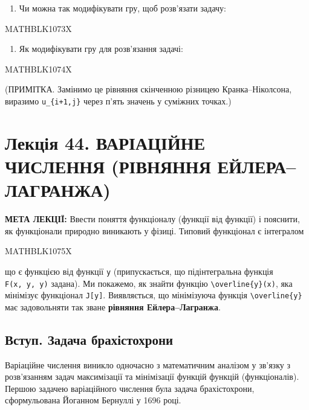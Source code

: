 \documentclass[
  ukrainian,
]{article}
\providecommand{\tightlist}{%
  \setlength{\itemsep}{0pt}\setlength{\parskip}{0pt}}
\begin{document}
\begin{enumerate}
\def\labelenumi{\arabic{enumi}.}
\setcounter{enumi}{3}
\tightlist
\item
  Чи можна так модифікувати гру, щоб розв'язати задачу:
\end{enumerate}

MATHBLK1073X

\begin{enumerate}
\def\labelenumi{\arabic{enumi}.}
\setcounter{enumi}{4}
\tightlist
\item
  Як модифікувати гру для розв'язання задачі:
\end{enumerate}

MATHBLK1074X

(ПРИМІТКА. Замінимо це рівняння скінченною різницею Кранка--Ніколсона,
виразимо \texttt{u\_\{i+1,j\}} через п'ять значень у суміжних точках.)

\section{Лекція 44. ВАРІАЦІЙНЕ ЧИСЛЕННЯ (РІВНЯННЯ
ЕЙЛЕРА--ЛАГРАНЖА)}\label{ux43bux435ux43aux446ux456ux44f-44.-ux432ux430ux440ux456ux430ux446ux456ux439ux43dux435-ux447ux438ux441ux43bux435ux43dux43dux44f-ux440ux456ux432ux43dux44fux43dux43dux44f-ux435ux439ux43bux435ux440ux430ux43bux430ux433ux440ux430ux43dux436ux430}

\textbf{МЕТА ЛЕКЦІЇ:} Ввести поняття функціоналу (функції від функції) і
пояснити, як функціонали природно виникають у фізиці. Типовий функціонал
є інтегралом

MATHBLK1075X

що є функцією від функції \texttt{y} (припускається, що підінтегральна
функція \texttt{F(x,\ y,\ y\textquotesingle{})} задана). Ми покажемо, як
знайти функцію \texttt{\textbackslash{}overline\{y\}(x)}, яка мінімізує
функціонал \texttt{J{[}y{]}}. Виявляється, що мінімізуюча функція
\texttt{\textbackslash{}overline\{y\}} має задовольняти так зване
\textbf{рівняння Ейлера--Лагранжа}.

\subsection{Вступ. Задача
брахістохрони}\label{ux432ux441ux442ux443ux43f.-ux437ux430ux434ux430ux447ux430-ux431ux440ux430ux445ux456ux441ux442ux43eux445ux440ux43eux43dux438}

Варіаційне числення виникло одночасно з математичним аналізом у зв'язку
з розв'язанням задач максимізації та мінімізації функцій функцій
(функціоналів). Першою задачею варіаційного числення була задача
брахістохрони, сформульована Йоганном Бернуллі у 1696 році.
\end{document}
